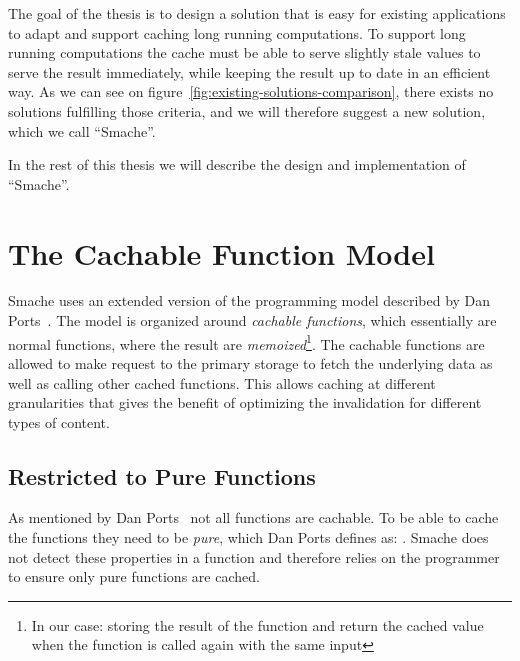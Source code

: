 The goal of the thesis is to design a solution that is easy for existing applications to adapt and support caching long running computations. To support long running computations the cache must be able to serve slightly stale values to serve the result immediately, while keeping the result up to date in an efficient way. As we can see on figure~\ref{fig:existing-solutions-comparison}, there exists no solutions fulfilling those criteria, and we will therefore suggest a new solution, which we call ``Smache''.

In the rest of this thesis we will describe the design and implementation of ``Smache''.


\section{The Cachable Function Model}
\label{sec:the_cachable_function_model}

Smache uses an extended version of the programming model described by Dan Ports~\cite{paper:liskov}. The model is organized around \emph{cachable functions}, which essentially are normal functions, where the result are \emph{memoized}\footnote{In our case: storing the result of the function and return the cached value when the function is called again with the same input}. The cachable functions are allowed to make request to the primary storage to fetch the underlying data as well as calling other cached functions. This allows caching at different granularities that gives the benefit of optimizing the invalidation for different types of content.


\subsection{Restricted to Pure Functions}
\label{subsec:restricted_to_pure_functions}

As mentioned by Dan Ports~\cite{paper:liskov} not all functions are cachable. To be able to cache the functions they need to be \emph{pure}, which Dan Ports defines as: . Smache does not detect these properties in a function and therefore relies on the programmer to ensure only pure functions are cached.

